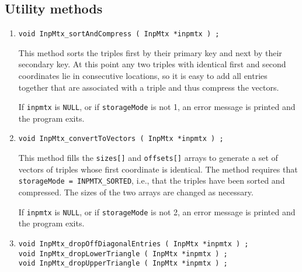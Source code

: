 \subsection{Utility methods}
\label{subsection:InpMtx:proto:utility}
\par
\begin{enumerate}
\item
\begin{verbatim}
void InpMtx_sortAndCompress ( InpMtx *inpmtx ) ;
\end{verbatim}
This method sorts the triples first by their primary key and
next by their secondary key.
At this point any two triples with identical first and second
coordinates lie in consecutive locations, so it is easy to add all
entries together that are associated with a triple and thus
compress the vectors.
\par {}
If {\tt inpmtx} is {\tt NULL},
or if {\tt storageMode} is not 1,
an error message is printed and the program exits.
\item
\begin{verbatim}
void InpMtx_convertToVectors ( InpMtx *inpmtx ) ;
\end{verbatim}
This method fills the {\tt sizes[]} and {\tt offsets[]} arrays
to generate a set of vectors of triples whose first coordinate is
identical.
The method requires that {\tt storageMode = INPMTX\_SORTED}, 
i.e., that the triples have been sorted and compressed.
The sizes of the two arrays are changed as necessary.
\par {}
If {\tt inpmtx} is {\tt NULL},
or if {\tt storageMode} is not 2,
an error message is printed and the program exits.
\item
\begin{verbatim}
void InpMtx_dropOffDiagonalEntries ( InpMtx *inpmtx ) ;
void InpMtx_dropLowerTriangle ( InpMtx *inpmtx ) ;
void InpMtx_dropUpperTriangle ( InpMtx *inpmtx ) ;
\end{verbatim}

\end{enumerate}
